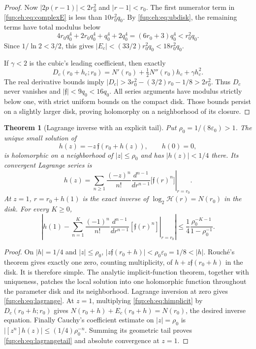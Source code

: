 \documentclass[11pt,letterpaper]{article}
\newtheorem{theorem}{Theorem}[section]
\theoremstyle{definition}\newtheorem{definition}[theorem]{Definition}
\theoremstyle{remark}\newtheorem{remark}[theorem]{Remark}
\begin{document}
\begin{proof}
Now $|2p(r-1)|<2r_0^2$ and $|r-1|<r_0$.
The first numerator term in \eqref{fup:eh:eq:complexE} is less than
$10r_0^2q_0$. By \eqref{fup:eh:eq:ubdisk}, the remaining terms have
total modulus below
\[
 4r_0q_0^4+2r_0q_0^4+q_0^4+2q_0^4
 =(6r_0+3)q_0^4<r_0^2q_0.
\]
Since $1/\ln2<3/2$, this gives
$|E_c|<(33/2)r_0^2q_0<18r_0^2q_0$.

If $\gamma<2$ is the cubic's leading coefficient, then exactly
\[
 D_c(r_0+h_c;r_0)=N'(r_0)+\tfrac12N''(r_0)h_c+\gamma h_c^2.
\]
The real derivative bounds imply
$|D_c|>3r_0^2-(3/2)r_0-1/8>2r_0^2$.
Thus $D_c$ never vanishes and $|\mathfrak f|<9q_0<16q_0$.
All series arguments have modulus strictly below one, with strict
uniform bounds on the compact disk. Those bounds persist on a
slightly larger disk, proving holomorphy on a neighborhood of its closure.
\end{proof}

\begin{theorem}[Lagrange inverse with an explicit tail]\label{fup:eh:thm:lagrange}
Put $\rho_0=1/(8\varepsilon_0)>1$. The unique small solution of
\begin{equation}\label{fup:eh:eq:himplicit}
 h(z)=-z\,\mathfrak f(r_0+h(z)),\qquad h(0)=0,
\end{equation}
is holomorphic on a neighborhood of $|z|\le\rho_0$ and has
$|h(z)|<1/4$ there. Its convergent Lagrange series is
\begin{equation}\label{fup:eh:eq:lagrange}
 h(z)=\sum_{n\ge1}\frac{(-z)^n}{n!}
 \left.\frac{d^{n-1}}{dr^{n-1}}\bigl[\mathfrak f(r)^n\bigr]
 \right|_{r=r_0}.
\end{equation}
At $z=1$, $r=r_0+h(1)$ is the exact inverse of
$\log_2\mathcal H(r)=N(r_0)$ in the disk. For every $K\ge0$,
\begin{equation}\label{fup:eh:eq:lagrangetail}
 \left|h(1)-\sum_{n=1}^K\frac{(-1)^n}{n!}
 \left.\frac{d^{n-1}}{dr^{n-1}}[\mathfrak f(r)^n]\right|_{r=r_0}\right|
 \le\frac14\frac{\rho_0^{-K-1}}{1-\rho_0^{-1}}.
\end{equation}
\end{theorem}
\begin{proof}
On $|h|=1/4$ and $|z|\le\rho_0$,
$|z\mathfrak f(r_0+h)|<\rho_0\varepsilon_0=1/8<|h|$.
Rouch\'e's theorem gives exactly one zero, counting multiplicity,
of $h+z\mathfrak f(r_0+h)$ in the disk. It is therefore simple.
The analytic implicit-function theorem, together with uniqueness,
patches the local solution into one holomorphic function throughout
the parameter disk and its neighborhood. Lagrange inversion at zero
gives \eqref{fup:eh:eq:lagrange}. At $z=1$, multiplying
\eqref{fup:eh:eq:himplicit} by $D_c(r_0+h;r_0)$ gives
$N(r_0+h)+E_c(r_0+h)=N(r_0)$, the desired inverse equation.
Finally Cauchy's coefficient estimate on $|z|=\rho_0$ is
$|[z^n]h(z)|\le(1/4)\rho_0^{-n}$. Summing its geometric tail
proves \eqref{fup:eh:eq:lagrangetail} and absolute convergence at $z=1$.
\end{proof}
\end{document}
